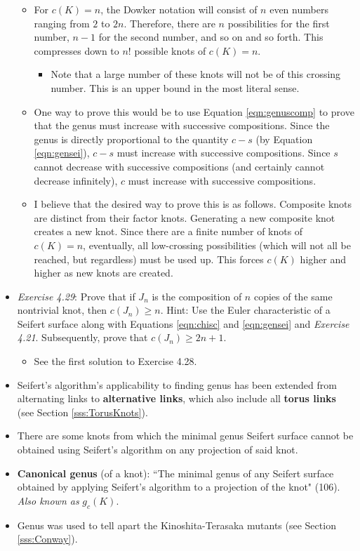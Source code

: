 \documentclass[titlepage]{article}
\numberwithin{figure}{section}
\numberwithin{table}{section}
\numberwithin{equation}{section}
\newcommand{\dq}[2]{``#1" (#2).}
\begin{document}
\begin{itemize}
    \begin{itemize}
        \item For $c(K)=n$, the Dowker notation will consist of $n$ even numbers ranging from $2$ to $2n$. Therefore, there are $n$ possibilities for the first number, $n-1$ for the second number, and so on and so forth. This compresses down to $n!$ possible knots of $c(K)=n$.
        \begin{itemize}
            \item Note that a large number of these knots will not be of this crossing number. This is an upper bound in the most literal sense.
        \end{itemize}
        \item One way to prove this would be to use Equation \ref{eqn:genuscomp} to prove that the genus must increase with successive compositions. Since the genus is directly proportional to the quantity $c-s$ (by Equation \ref{eqn:gensei}), $c-s$ must increase with successive compositions. Since $s$ cannot decrease with successive compositions (and certainly cannot decrease infinitely), $c$ must increase with successive compositions.
        \item I believe that the desired way to prove this is as follows. Composite knots are distinct from their factor knots. Generating a new composite knot creates a new knot. Since there are a finite number of knots of $c(K)=n$, eventually, all low-crossing possibilities (which will not all be reached, but regardless) must be used up. This forces $c(K)$ higher and higher as new knots are created.
    \end{itemize}
    \item \emph{Exercise 4.29}: Prove that if $J_n$ is the composition of $n$ copies of the same nontrivial knot, then $c(J_n)\geq n$. Hint: Use the Euler characteristic of a Seifert surface along with Equations \ref{eqn:chisc} and \ref{eqn:gensei} and \emph{Exercise 4.21}. Subsequently, prove that $c(J_n)\geq 2n+1$.
    \begin{itemize}
        \item See the first solution to Exercise 4.28.
    \end{itemize}
    \item Seifert's algorithm's applicability to finding genus has been extended from alternating links to \textbf{alternative links}, which also include all \textbf{torus links} (see Section \ref{sss:TorusKnots}).
    \item There are some knots from which the minimal genus Seifert surface cannot be obtained using Seifert's algorithm on any projection of said knot.
    \item \textbf{Canonical genus} (of a knot): \dq{The minimal genus of any Seifert surface obtained by applying Seifert's algorithm to a projection of the knot}{106} \emph{Also known as} $g_c(K)$.
    \item Genus was used to tell apart the Kinoshita-Terasaka mutants (see Section \ref{sss:Conway}).
\end{itemize}
\newpage
\end{document}
